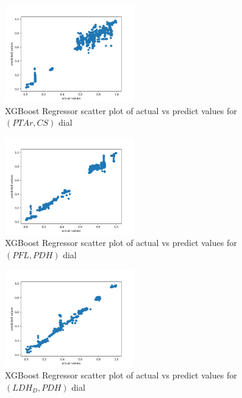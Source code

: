 \documentclass[12pt,chapterheads]{ucsd}
\begin{document}
\begin{figure}[h] 
\centering
\includegraphics[width=0.5\textwidth]{PTAr_CS_xgboost_no_params}
\caption[XGBoost Regressor scatter plot of actual vs predict values for $(PTAr, CS)$ dial]
{XGBoost Regressor scatter plot of actual vs predict values for $(PTAr, CS)$ dial}
\label{fig:PtarCsXgb}
\end{figure}

\begin{figure}[h] 
\centering
\includegraphics[width=0.5\textwidth]{PFL_PDH_xgboost_no_params}
\caption[XGBoost Regressor scatter plot of actual vs predict values for $(PFL, PDH)$ dial]
{XGBoost Regressor scatter plot of actual vs predict values for $(PFL, PDH)$ dial}
\label{fig:PflPdhXgb}
\end{figure}

\begin{figure}[h] 
\centering
\includegraphics[width=0.5\textwidth]{LDH_D_PDH_xgboost_no_params}
\caption[XGBoost scatter plot of actual vs predict values for \string(LDH\textunderscore D, PDH) dial]
{XGBoost Regressor scatter plot of actual vs predict values for $(LDH_D, PDH)$ dial}
\label{fig:LdhPdhXgb}
\end{figure}
\end{document}
